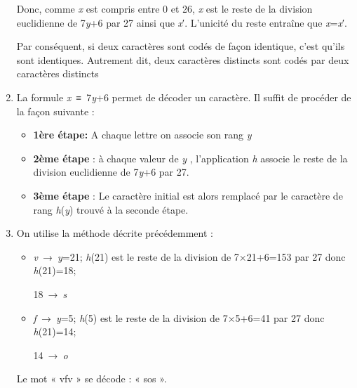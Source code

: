 \begin{corrige}
\begin{enumerate}
          \par
          Donc, comme \textit{x} est compris entre 0 et 26, \textit{x} est le reste de la division euclidienne de 7\textit{y}+6 par 27 ainsi que \textit{x}′. L'unicité du reste entraîne que \textit{x}=\textit{x}′.
          \par
          Par conséquent, si deux caractères sont codés de façon identique, c'est qu'ils sont identiques. Autrement dit, deux caractères distincts sont codés par deux caractères distincts
          \item
          La formule \textit{x} ≡ 7\textit{y}+6 permet de décoder un caractère. Il suffit de procéder de la façon suivante :
          \begin{itemize}
               \item
               \textbf{1ère étape:} A chaque lettre on associe son rang \textit{y}
               \item
               \textbf{2ème étape} : à chaque valeur de \textit{y} , l'application \textit{h} associe le reste de la division euclidienne de 7\textit{y}+6 par 27.
               \item
               \textbf{3ème étape} : Le caractère initial est alors remplacé par le caractère de rang \textit{h}(\textit{y}) trouvé à la seconde étape.
          \end{itemize}
          \item
          On utilise la méthode décrite précédemment :
          \begin{itemize}
               \item
               \textit{v} → \textit{y}=21;
               \textit{h}(21) est le reste de la division de 7×21+6=153 par 27 donc \textit{h}(21)=18;
               \par
               18 → \textit{s}
               \item
               \textit{f} → \textit{y}=5;
               \textit{h}(5) est le reste de la division de 7×5+6=41 par 27 donc \textit{h}(21)=14;
               \par
               14 → \textit{o}
          \end{itemize}
          Le mot « vfv » se décode : « sos ».
     \end{enumerate}
\end{corrige}

